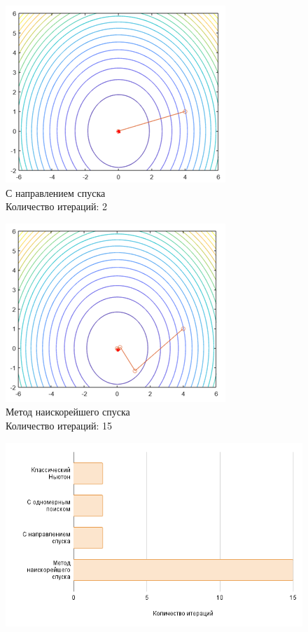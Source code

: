 \documentclass[12pt]{article}
\begin{document}
\begin{enumerate}
	\begin{figure}[H]
	\begin{minipage}{.5\textwidth}
    	\centering
    	\includegraphics[scale=0.75]{img/f3_3.png}
		\\ С направлением спуска
		\\ Количество итераций: 2
	\end{minipage}
    \begin{minipage}{.5\textwidth}
    \centering
    	\includegraphics[scale=0.75]{img/f3_4.png}
    	\\ Метод наискорейшего спуска
    	\\ Количество итераций: 15
    \end{minipage}
    \end{figure}

    \begin{figure}[H]
    	\centering
    	\includegraphics[scale=0.6]{img/chart.png}
    \end{figure}


\end{enumerate}
\end{document}
